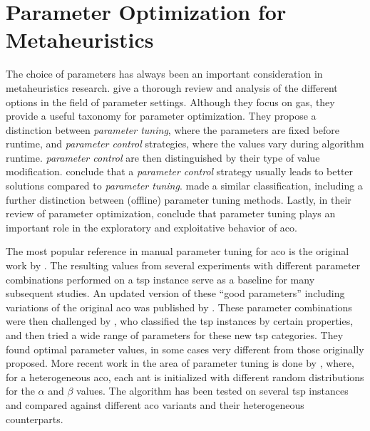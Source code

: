 \section{Parameter Optimization for Metaheuristics}
\label{chap:paramopt}

The choice of parameters has always been an important consideration in metaheuristics research. \citet{eiben1999parameter} give a thorough review and analysis of the different options in the field of parameter settings. Although they focus on \glspl{ga}, they provide a useful taxonomy for parameter optimization. They propose a distinction between \textit{parameter tuning}, where the parameters are fixed before runtime, and \textit{parameter control} strategies, where the values vary during algorithm runtime. \textit{parameter control} are then distinguished by their type of value modification. \citeauthor{eiben1999parameter} conclude that a \textit{parameter control} strategy usually leads to better solutions compared to \textit{parameter tuning}. \citet{talbi2009metaheuristics} made a similar classification, including a further distinction between (offline) parameter tuning methods.
Lastly, in their review of parameter optimization, \citet{wong2008parameter} conclude that parameter tuning plays an important role in the exploratory and exploitative behavior of \gls{aco}.

The most popular reference in manual parameter tuning for \gls{aco} is the original work by \citeauthor{dorigo1991ant}  \cite{dorigo1991ant,dorigo1996ant}. The resulting values from several experiments with different parameter combinations performed on a \gls{tsp} instance serve as a baseline for many subsequent studies. An updated version of these \enquote{good parameters} including variations of the original \gls{aco} was published by \citet{dorigo2004ant}.
These parameter combinations were then challenged by \citet{gaertner2005optimal}, who classified the \gls{tsp} instances by certain properties, and then tried a wide range of parameters for these new \gls{tsp} categories. They found optimal parameter values, in some cases very different from those originally proposed.
More recent work in the area of parameter tuning is done by \citet{tuani2018h}, where, for a heterogeneous \gls{aco}, each ant is initialized with different random distributions for the $\alpha$ and $\beta$ values. The algorithm has been tested on several \gls{tsp} instances and compared against different \gls{aco} variants and their heterogeneous counterparts.

